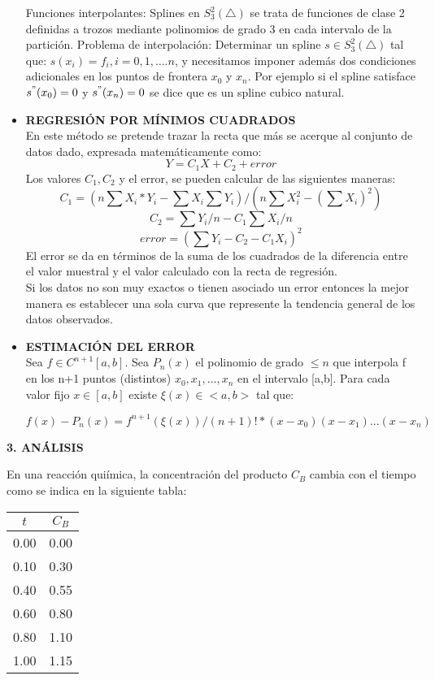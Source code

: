 \documentclass[10pt,a4paper]{article}
\begin{document}
\begin{multicols}{2}
\begin{itemize}
	Funciones interpolantes: Splines en $S_3^2 (\triangle)$ se trata de funciones de clase 2 definidas a trozos mediante polinomios de grado 3 en cada intervalo de la partición. 
	Problema de interpolación: Determinar un spline $s\in S_3^2 (\triangle)$ tal que:
	$s (x_i )=f_i, i=0,1,….n$, y necesitamos imponer además dos condiciones adicionales en los puntos de frontera $x_0$ y $x_n$. Por ejemplo si el spline satisface  $s^" (x_0 )=0$ y $s^" (x_n )=0$ se dice que es un spline cubico natural.
	
	\item \textbf{REGRESIÓN POR MÍNIMOS CUADRADOS}\\
	En este método se pretende trazar la recta que más se acerque al conjunto de datos dado, expresada matemáticamente como: \[Y=C_1X+C_2+error\]
	Los valores $C_1, C_2$ y el error, se pueden calcular de las siguientes maneras:
	{\scriptsize \[C_1=(n\sum X_i*Y_i -\sum X_i\sum Y_i)/(n\sum X_i^{2}-(\sum X_i)^{2})\]}
	\[C_2=\sum Y_i/n - C_1\sum X_i/n\]
	\[error=(\sum Y_i-C_2-C_1X_i)^{2}\]
	El error se da en términos de la suma de los cuadrados de la diferencia entre el valor muestral y el valor calculado con la recta de regresión.\\
	Si los datos no son muy exactos o tienen asociado un error entonces la mejor manera es establecer una sola curva que represente la tendencia general de los datos observados.
	
	\item \textbf{ESTIMACIÓN DEL ERROR}\\
	Sea $f\in C^{n+1}[a,b]$. Sea $P_n(x)$ el polinomio de grado $\leq n$ que interpola f en los n+1 puntos (distintos) $x_0, x_1, ..., x_n$ en el intervalo [a,b]. Para cada valor fijo $x\in [a,b]$ existe $\xi (x) \in <a,b>$ tal que:
	
	 $f(x)-P_n(x) = f^{n+1}(\xi (x))/(n+1)! * (x-x_0)(x-x_1)...(x-x_n)$

\end{itemize}

\begin{center}
	{\large \bf 3. ANÁLISIS}
	
\end{center}

\noindent En una reacción quiímica, la concentración del producto $C_B$ cambia con el tiempo como se indica en la siguiente tabla:


\begin{center}
	\begin{tabular}{ |c|c| }
		\hline
		$t$ & $C_B$ \\ \hline
		0.00 & 0.00 \\ \hline
		0.10 & 0.30 \\ \hline
		0.40 & 0.55 \\ \hline
		0.60 & 0.80 \\ \hline
		0.80 & 1.10 \\ \hline
		1.00 & 1.15 \\ \hline
	\end{tabular}
\end{center}


\end{multicols}
\end{document}
